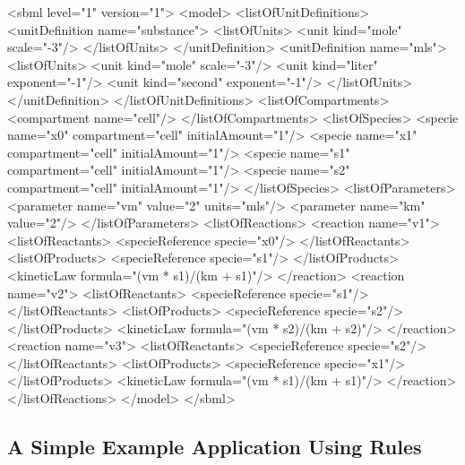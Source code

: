 \documentclass[10pt]{cekarticle}
\begin{document}
\begin{example}
<sbml level="1" version="1">
    <model>
        <listOfUnitDefinitions>
            <unitDefinition name="substance">
                <listOfUnits>
                    <unit kind="mole" scale="-3"/>
                </listOfUnits>
            </unitDefinition>
            <unitDefinition name="mls">
                <listOfUnits>
                    <unit kind="mole"   scale="-3"/>
                    <unit kind="liter"  exponent="-1"/>
                    <unit kind="second" exponent="-1"/>
                </listOfUnits>
            </unitDefinition>
        </listOfUnitDefinitions>
        <listOfCompartments>
            <compartment name="cell"/>
        </listOfCompartments>
        <listOfSpecies>
            <specie name="x0" compartment="cell" initialAmount="1"/>
            <specie name="x1" compartment="cell" initialAmount="1"/>
            <specie name="s1" compartment="cell" initialAmount="1"/>
            <specie name="s2" compartment="cell" initialAmount="1"/>
        </listOfSpecies>
        <listOfParameters>
            <parameter name="vm" value="2" units="mls"/>
            <parameter name="km" value="2"/>
        </listOfParameters>
        <listOfReactions>
            <reaction name="v1">
                <listOfReactants>
                    <specieReference specie="x0"/>
                </listOfReactants>
                <listOfProducts>
                    <specieReference specie="s1"/>
                </listOfProducts>
                <kineticLaw formula="(vm * s1)/(km + s1)"/>
            </reaction>
            <reaction name="v2">
                <listOfReactants>
                    <specieReference specie="s1"/>
                </listOfReactants>
                <listOfProducts>
                    <specieReference specie="s2"/>
                </listOfProducts>
                <kineticLaw formula="(vm * s2)/(km + s2)"/>
            </reaction>
            <reaction name="v3">
                <listOfReactants>
                    <specieReference specie="s2"/>
                </listOfReactants>
                <listOfProducts>
                    <specieReference specie="x1"/>
                </listOfProducts>
                <kineticLaw formula="(vm * s1)/(km + s1)"/>
            </reaction>
        </listOfReactions>
    </model>
</sbml>
\end{example}


\subsection{A Simple Example Application Using Rules}
\label{subsection:ruleseg}
\end{document}
